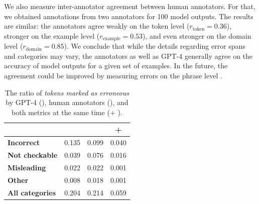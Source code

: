 We also measure inter-annotator agreement between human annotators. For that, we obtained annotations from two annotators for 100 model outputs. The results are similar: the annotators agree weakly on the token level ($r_{\text{token}}=0.36$), stronger on the example level ($r_{\text{example}}=0.53$), and even stronger on the domain level ($r_{\text{domain}}=0.85$). We conclude that while the details regarding error spans and categories may vary, the annotators as well as GPT-4 generally agree on the accuracy of model outputs for a given set of examples. In the future, the agreement could be improved by measuring errors on the phrase level \cite{vamvas2022little}.


\begin{table}[t]
    \small
    \centering
    \begin{tabular}{lccc}
        \toprule
        {}                       & \gptmetric{} & \humanmetric{} & \gptmetric{} + \humanmetric{} \\
        \midrule
        \bfseries Incorrect      & 0.135        & 0.099          & 0.040                         \\
        \bfseries Not checkable  & 0.039        & 0.076          & 0.016                         \\
        \bfseries Misleading     & 0.022        & 0.022          & 0.001                         \\
        \bfseries Other          & 0.008        & 0.018          & 0.001                         \\
        \bfseries All categories & 0.204        & 0.214          & 0.059                         \\
        \bottomrule
    \end{tabular}
    \caption{The ratio of \textit{tokens marked as erroneous} by GPT-4 (\gptmetric), human annotators (\humanmetric), and both metrics at the same time (\gptmetric + \humanmetric).}
    \label{tab:errors_tokenlevel}
\end{table}




